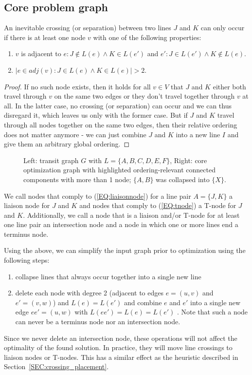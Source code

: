 \documentclass{llncs}
\begin{document}
%
\subsection{Core problem graph}\label{SEC:coreprobgraph}
%

An inevitable crossing (or separation) between two lines $J$ and $K$ can only occur if there is at least one node $v$ with one of the following properties:
\begin{enumerate}
\item $v$ is adjacent to $e : J \not\in L(e) \land K \in L(e')$ and $e' : J \in L(e') \land K \not\in L(e)$. \label{EQ:liaisonnode}
\item $|{e \in adj(v) : J \in L(e) \land K \in L(e)}| > 2$. \label{EQ:tnode}
\end{enumerate}
\begin{proof} If no such node exists, then it holds for all $v \in V$ that $J$ and $K$ either both travel through $v$ on the same two edges or they don't travel together through $v$ at all. In the latter case, no crossing (or separation) can occur and we can thus disregard it, which leaves us only with the former case. But if $J$ and $K$ travel through all nodes together on the same two edges, then their relative ordering does not matter anymore - we can just combine $J$ and $K$ into a new line $I$ and give them an arbitrary global ordering.
\end{proof}
\begin{figure}[t]
\centering
	
	\hspace{0.6cm}
	
	\caption{Left: transit graph $G$ with $L = \{A, B, C, D, E, F\}$, Right: core optimization graph with highlighted ordering-relevant connected components with more than 1 node; $\{A, B\}$ was collapsed into $\{X\}$.}
\end{figure}
We call nodes that comply to (\ref{EQ:liaisonnode}) for a line pair $A = \{J, K\}$ a liaison node for $J$ and $K$ and nodes that comply to (\ref{EQ:tnode}) a T-node for $J$ and $K$. Additionally, we call a node that is a liaison and/or T-node for at least one line pair an intersection node and a node in which one or more lines end a terminus node.

Using the above, we can simplify the input graph prior to optimization using the following steps:
\begin{enumerate}
\item collapse lines that always occur together into a single new line
\item delete each node with degree 2 (adjacent to edges $e = (u, v)$ and $e' = (v, w)$) and $L(e) = L(e')$ and combine $e$ and $e'$ into a single new edge $ee' = (u, w)$ with $L(ee') = L(e) = L(e')$ . Note that such a node can never be a terminus node nor an intersection node.
\end{enumerate}
Since we never delete an intersection node, these operations will not affect the optimality of the found solution. In practice, they will move line crossings to liaison nodes or T-nodes. This has a similar effect as the heuristic described in Section~\ref{SEC:crossing_placement}.
\end{document}
